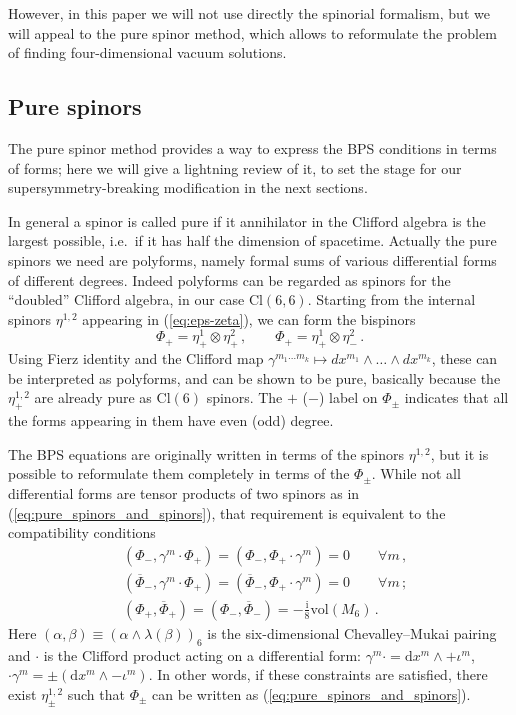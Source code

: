 \documentclass[12pt]{article}
\newcommand{\dd}{\mathrm{d}}
\newcommand{\ii}{\mathrm{i}}
\newcommand{\vol}{\mathrm{vol}}
\begin{document}
However, in this paper we will not use directly the spinorial formalism, but we will appeal to the pure spinor method, which allows to reformulate the problem of finding four-dimensional vacuum solutions. 

\subsection{Pure spinors} \label{sub:psp}

The pure spinor method \cite{gmpt2,gmpt3} provides a way to express the BPS conditions in terms of forms; here we will give a lightning review of it, to set the stage for our supersymmetry-breaking modification in the next sections. 

In general a spinor is called pure if it annihilator in the Clifford algebra is the largest possible, i.e.~if it has half the dimension of spacetime. Actually the pure spinors we need are polyforms, namely formal sums of various differential forms of different degrees. Indeed polyforms can be regarded as spinors for the ``doubled'' Clifford algebra, in our case $\mathrm{Cl}(6,6)$. Starting from the internal spinors $\eta^{1,2}$ appearing in (\ref{eq:eps-zeta}), we can form the bispinors
\begin{equation}
\label{eq:pure_spinors_and_spinors}
\Phi_+ = \eta^1_+ \otimes \eta^2_+ \, , \qquad   \Phi_+ = \eta^1_+ \otimes \eta^2_- \, .
\end{equation}
Using Fierz identity and the Clifford map $\gamma^{m_1 \dots m_k} \mapsto dx^{m_1}\wedge \ldots \wedge dx^{m_k}$, these can be interpreted as polyforms, and can be shown to be pure, basically because the $\eta^{1,2}_+$ are already pure as $\mathrm{Cl}(6)$ spinors. The $+$ ($-$) label on $\Phi_\pm$ indicates that all the forms appearing in them have even (odd) degree. 

The BPS equations are originally written in terms of the spinors $\eta^{1,2}$, but it is possible to reformulate them completely in terms of the $\Phi_\pm$. While not all  differential forms are tensor products of two spinors as in (\ref{eq:pure_spinors_and_spinors}), that requirement is equivalent to the compatibility conditions
\begin{equation}\label{eq:comp}
\begin{split}
&(\Phi_-, \gamma^m \cdot \Phi_+) = (\Phi_-, \Phi_+ \cdot \gamma^m) = 0 \qquad \forall m\,, \\
&(\overline{\Phi}_-, \gamma^m \cdot \Phi_+) = (\overline{\Phi}_-, \Phi_+ \cdot \gamma^m) = 0 \qquad \forall m\,;\\
& (\Phi_+ , \overline{\Phi}_+) = (\Phi_- , \overline{\Phi}_-) = - \frac{\ii}{8} \vol(M_6) \, .
\end{split}
\end{equation}
Here $(\alpha , \beta)\equiv (\alpha \wedge \lambda(\beta))_6$ is the six-dimensional Chevalley--Mukai pairing and $\cdot$ is the Clifford product acting on a differential form: $\gamma^m \cdot = \dd x^m \wedge + \iota^m$, $\cdot \gamma^m=\pm (\dd x^m \wedge - \iota^m)$. 
In other words, if these constraints are satisfied, there exist $\eta^{1,2}_\pm$ such that $\Phi_\pm$ can be written as (\ref{eq:pure_spinors_and_spinors}). 
\end{document}
